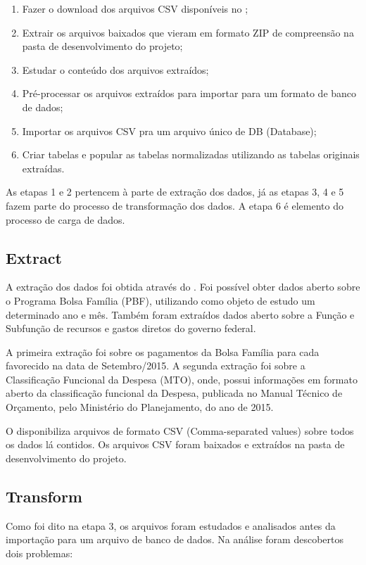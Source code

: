 \documentclass[12pt]{article}
\begin{document}
	\begin{enumerate}
		\item Fazer o download dos arquivos CSV disponíveis no \cite{portal};
		\item Extrair os arquivos baixados que vieram em formato ZIP de compreensão na pasta de desenvolvimento do projeto;
		\item Estudar o conteúdo dos arquivos extraídos;
		\item Pré-processar os arquivos extraídos para importar para um formato de banco de dados;
		\item Importar os arquivos CSV pra um arquivo único de DB (Database);
		\item Criar tabelas e popular as tabelas normalizadas utilizando as tabelas originais extraídas.
	\end{enumerate}
	
	As etapas 1 e 2 pertencem à parte de extração dos dados, já as etapas 3, 4 e 5 fazem parte do processo de transformação dos dados. A etapa 6 é elemento do processo de carga de dados.
	
	\subsection{Extract}
	\label{sec:e}
	
	A extração dos dados foi obtida através do \cite{portal}. Foi possível obter dados aberto sobre o Programa Bolsa Família (PBF), utilizando como objeto de estudo um determinado ano e mês. Também foram extraídos dados aberto sobre a Função e Subfunção de recursos e gastos diretos do governo federal.
	
	A primeira extração foi sobre os pagamentos da Bolsa Família para cada favorecido na data de Setembro/2015. A segunda extração foi sobre a Classificação Funcional da Despesa (MTO), onde, possui informações em formato aberto da classificação funcional da Despesa, publicada no Manual Técnico de Orçamento, pelo Ministério do Planejamento, do ano de 2015.
	
	O \cite{portal} disponibiliza arquivos de formato CSV (Comma-separated values) sobre todos os dados lá contidos. Os arquivos CSV foram baixados e extraídos na pasta de desenvolvimento do projeto.
	
	\subsection{Transform}
	\label{sec:t}
	
	Como foi dito na etapa 3, os arquivos foram estudados e analisados antes da importação para um arquivo de banco de dados. Na análise foram descobertos dois problemas:
	
\end{document}
